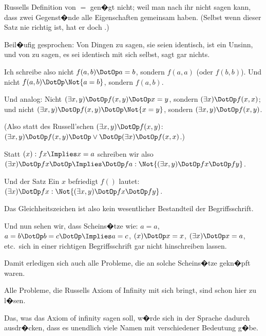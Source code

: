 {Russells Definition von \glqq{}$=$\grqq{} gen�gt nicht; weil
man nach ihr nicht sagen kann, dass zwei Gegenst�nde
alle Eigenschaften gemeinsam haben.
(Selbst wenn dieser Satz nie richtig ist, hat er
doch .)}


{Beil�ufig gesprochen: Von  Dingen zu
sagen, sie seien identisch, ist ein Unsinn, und von
 zu sagen, es sei identisch mit sich selbst,
sagt gar nichts.}


{Ich schreibe also nicht \glqq{}$f(a,b) \DotOp a = b$\grqq{}, sondern
\glqq{}$f(a,a)$\grqq{} (oder \glqq{}$f(b,b)$\grqq{}). Und nicht \glqq{}$f(a,b) \DotOp \Not{a = b}$\grqq{},
sondern \glqq{}$f(a,b)$\grqq{}.}


{Und analog: Nicht \glqq{}$(\exists x,y) \DotOp f(x,y) \DotOp x = y$\grqq{},
sondern \glqq{}$(\exists x) \DotOp f(x,x)$\grqq{}; und nicht \glqq{}$(\exists x,y) \DotOp f(x,y) \DotOp
\Not{x = y}$\grqq{}, sondern \glqq{}$(\exists x,y) \DotOp f(x,y)$\grqq{}.

(Also statt des Russell'schen \glqq{}$(\exists x,y) \DotOp f(x,y)$\grqq{}:
\glqq{}$(\exists x,y) \DotOp f(x,y) \DotOp \lor \DotOp (\exists x) \DotOp f(x,x)$\grqq{}.)}


{Statt \glqq{}$(x) : fx \Implies x = a$\grqq{} schreiben wir also \zumBeispiel\ \glqq{}$(\exists
x) \DotOp fx \DotOp \Implies \DotOp fa : \Not{(\exists x,y) \DotOp fx \DotOp fy}$\grqq{}.

Und der Satz \glqq{} Ein $x$ befriedigt $f()$\grqq{} lautet:
\glqq{}$(\exists x) \DotOp fx : \Not{(\exists x,y) \DotOp fx \DotOp fy}$\grqq{}.}


{Das Gleichheitszeichen ist also kein wesentlicher
Bestandteil der Begriffsschrift.}


{Und nun sehen wir, dass Scheins�tze wie:
\glqq{}$a = a$\grqq{}, \glqq{}$a = b \DotOp b = c \DotOp \Implies a = c$\grqq{}, \glqq{}$(x) \DotOp x = x$\grqq{}, \glqq{}$(\exists x) \DotOp
x = a$\grqq{}, etc.\ sich in einer richtigen Begriffsschrift gar
nicht hinschreiben lassen.}


{Damit erledigen sich auch alle Probleme, die
an solche Scheins�tze gekn�pft waren.

Alle Probleme, die Russells \glqq{}Axiom of Infinity\grqq{}
\enlargethispage{7pt} %
mit sich bringt, sind schon hier zu l�sen.

Das, was das Axiom of infinity sagen soll, w�rde
sich in der Sprache dadurch ausdr�cken, dass es
unendlich viele Namen mit verschiedener Bedeutung
g�be.}


